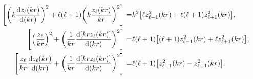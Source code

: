 %
\begin{align}
\qty[\qty(k\dv{z_\ell(kr)}{(kr)})^2 + \ell(\ell+1)\qty(k\frac{z_\ell(kr)}{kr})^2] =& k^2
		\qty[\ell z_{\ell-1}^2(kr) + \ell(\ell+1)z_{\ell+1}^2(kr)],\\
\qty[\qty(\frac{ z_{\ell}}{kr})^2 + \qty(\frac{1}{kr}\dv{[kr z_\ell(kr)]}{(kr)})^2] =&
 	\ell(\ell+1)\qty[(\ell+1) z_{\ell-1}^2(kr)+ \ell z_{\ell+1}^2(kr)],  \\
\qty[\frac{ z_{\ell}}{kr}\dv{z_\ell(kr)}{(kr)} + \qty(\frac{1}{kr}\dv{[kr z_\ell(kr)]}{(kr)})^2] =&
	 	\ell(\ell+1)\qty[z_{\ell-1}^2(kr)- z_{\ell+1}^2(kr)].
\end{align}
%
